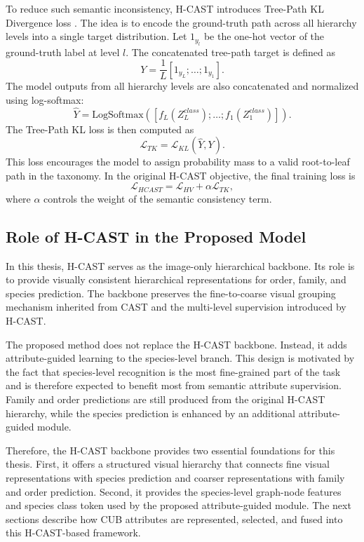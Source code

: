 To reduce such semantic inconsistency, H-CAST introduces Tree-Path KL Divergence loss \cite{park2025visually}. The idea is to encode the ground-truth path across all hierarchy levels into a single target distribution. Let \(1_{y_l}\) be the one-hot vector of the ground-truth label at level \(l\). The concatenated tree-path target is defined as
\begin{equation}
    Y =
    \frac{1}{L}
    [1_{y_L}; \ldots; 1_{y_1}].
\end{equation}
The model outputs from all hierarchy levels are also concatenated and normalized using log-softmax:
\begin{equation}
    \hat{Y}
    =
    \mathrm{LogSoftmax}
    \left(
        [f_L(Z_L^{class}); \ldots; f_1(Z_1^{class})]
    \right).
\end{equation}
The Tree-Path KL loss is then computed as
\begin{equation}
    \mathcal{L}_{TK}
    =
    \mathcal{L}_{KL}(\hat{Y}, Y).
\end{equation}
This loss encourages the model to assign probability mass to a valid root-to-leaf path in the taxonomy. In the original H-CAST objective, the final training loss is
\begin{equation}
    \mathcal{L}_{HCAST}
    =
    \mathcal{L}_{HV}
    +
    \alpha \mathcal{L}_{TK},
\end{equation}
where \(\alpha\) controls the weight of the semantic consistency term.

\subsection{Role of H-CAST in the Proposed Model}

In this thesis, H-CAST serves as the image-only hierarchical backbone. Its role is to provide visually consistent hierarchical representations for order, family, and species prediction. The backbone preserves the fine-to-coarse visual grouping mechanism inherited from CAST and the multi-level supervision introduced by H-CAST.

The proposed method does not replace the H-CAST backbone. Instead, it adds attribute-guided learning to the species-level branch. This design is motivated by the fact that species-level recognition is the most fine-grained part of the task and is therefore expected to benefit most from semantic attribute supervision. Family and order predictions are still produced from the original H-CAST hierarchy, while the species prediction is enhanced by an additional attribute-guided module.

Therefore, the H-CAST backbone provides two essential foundations for this thesis. First, it offers a structured visual hierarchy that connects fine visual representations with species prediction and coarser representations with family and order prediction. Second, it provides the species-level graph-node features and species class token used by the proposed attribute-guided module. The next sections describe how CUB attributes are represented, selected, and fused into this H-CAST-based framework.